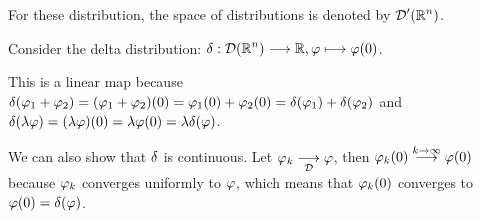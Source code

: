 \documentclass[11pt, openright]{book}
\begin{document}
For these distribution, the space of distributions is denoted by $\displaystyle{\mathcal{D}'(\mathbb{R}^n)}$.

\begin{example}
    Consider the delta distribution: $\displaystyle{\delta:\mathcal{D}(\mathbb{R}^n)\longrightarrow\mathbb{R}}, \varphi \longmapsto \varphi(0)$.

    This is a linear map because $\displaystyle{\delta(\varphi_1+\varphi_2)=(\varphi_1+\varphi_2)(0)=\varphi_1(0)+\varphi_2(0)=\delta(\varphi_1)+\delta(\varphi_2)}$ and $\displaystyle{\delta(\lambda\varphi)=(\lambda\varphi)(0)=\lambda\varphi(0)=\lambda\delta(\varphi)}$.

    We can also show that $\displaystyle{\delta}$ is continuous. Let $\displaystyle{\varphi_k \underset{\mathcal{D}}{\longrightarrow} \varphi}$, then $\displaystyle{\varphi_k(0) \overset{k\to \infty}{\longrightarrow} \varphi(0)}$ because $\displaystyle{\varphi_k}$ converges uniformly to $\displaystyle{\varphi}$, which means that $\displaystyle{\varphi_k(0)}$ converges to $\displaystyle{\varphi(0)=\delta(\varphi)}$.

\end{example}
\end{document}
